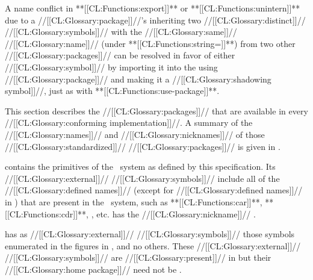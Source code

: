 \itemitem{--} 
A name conflict in **[[CL:Functions:export]]** or **[[CL:Functions:unintern]]** 
due to a //[[CL:Glossary:package]]//'s inheriting two //[[CL:Glossary:distinct]]// //[[CL:Glossary:symbols]]// 
with the //[[CL:Glossary:same]]// //[[CL:Glossary:name]]// (under **[[CL:Functions:string=]]**)
from two other //[[CL:Glossary:packages]]// can be resolved in
favor of either //[[CL:Glossary:symbol]]// by importing it into the using
//[[CL:Glossary:package]]// and making it a //[[CL:Glossary:shadowing symbol]]//,
just as with **[[CL:Functions:use-package]]**.
\endlist

\endsubsubsubsection%

\endsubsubsection%

\endsubSection%



This section describes the //[[CL:Glossary:packages]]// that are available
in every //[[CL:Glossary:conforming implementation]]//.  A summary of the
//[[CL:Glossary:names]]// and //[[CL:Glossary:nicknames]]// of those //[[CL:Glossary:standardized]]// //[[CL:Glossary:packages]]// 
is given in \thenextfigure.











 
 contains the primitives of the \clisp\ system as
defined by this specification.  Its //[[CL:Glossary:external]]// //[[CL:Glossary:symbols]]// include
all of the //[[CL:Glossary:defined names]]// (except for //[[CL:Glossary:defined names]]// in
) that are present in the \clisp\ system, 
such as **[[CL:Functions:car]]**, **[[CL:Functions:cdr]]**,  , etc.
 has the //[[CL:Glossary:nickname]]// .
 
 has as //[[CL:Glossary:external]]// //[[CL:Glossary:symbols]]// those 
symbols enumerated in the figures in \secref\CLsymbols, and no others.
These //[[CL:Glossary:external]]// //[[CL:Glossary:symbols]]// are //[[CL:Glossary:present]]// in 
but their //[[CL:Glossary:home package]]// need not be .

